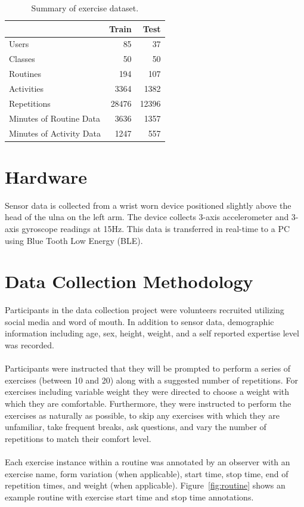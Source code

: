 \documentclass[12pt]{report}
\newcommand{\1}[0]{\mathbbm{1}}
\begin{document}
\begin{table}[ht]
    \centering
    \begin{tabular}{l r r}\hline
    & \textbf{Train} &\textbf{Test} \\\hline
    Users & 85 & 37\\
    Classes & 50 & 50\\
    Routines & 194 & 107\\
    Activities & 3364 & 1382\\
    Repetitions & 28476 & 12396\\
    Minutes of Routine Data & 3636 & 1357\\
    Minutes of Activity Data & 1247 & 557\\
    \end{tabular}
    \caption[Summary of exercise dataset]{Summary of exercise dataset.}
    \label{table:dataset}
\end{table}

\section{Hardware}
Sensor data is collected from a wrist worn device positioned slightly
above the head of the ulna on the left arm.
The device collects 3-axis accelerometer and 3-axis gyroscope readings at 15Hz.
This data is transferred in real-time to a PC using Blue Tooth Low Energy (BLE).

\section{Data Collection Methodology}
Participants in the data collection project were volunteers recruited utilizing social media
and word of mouth. In addition to sensor data, demographic information including age, sex, height, weight,
and a self reported expertise level was recorded.
\\\\
Participants were instructed that they will be prompted to perform a series of exercises (between 10 and 20)
along with a suggested number of repetitions. For exercises including variable weight they were directed
to choose a weight with which they are comfortable. Furthermore, they were instructed to perform the exercises
as naturally as possible, to skip any exercises with which they are unfamiliar, take frequent breaks,
ask questions, and vary the number of repetitions to match their comfort level.
\\\\
Each exercise instance within a routine was annotated by an observer with an exercise name,
form variation (when applicable), start time, stop time, end of repetition times, and weight (when applicable).
Figure~\ref{fig:routine} shows an example routine with exercise start time and stop time annotations.
\end{document}

